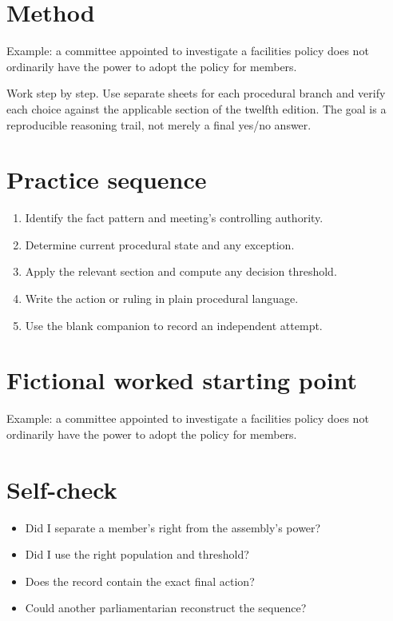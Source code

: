 \documentclass[11pt]{article}
\begin{document}
\SuiteOpen
\section{Method}
Example: a committee appointed to investigate a facilities policy does not ordinarily have the power to adopt the policy for members.

Work step by step. Use separate sheets for each procedural branch and verify each choice against the applicable section of the twelfth edition. The goal is a reproducible reasoning trail, not merely a final yes/no answer.

\section{Practice sequence}
\begin{enumerate}[leftmargin=*,itemsep=4pt]
\item Identify the fact pattern and meeting’s controlling authority.
\item Determine current procedural state and any exception.
\item Apply the relevant section and compute any decision threshold.
\item Write the action or ruling in plain procedural language.
\item Use the blank companion to record an independent attempt.
\end{enumerate}

\section{Fictional worked starting point}
Example: a committee appointed to investigate a facilities policy does not ordinarily have the power to adopt the policy for members.

\section{Self-check}
\begin{itemize}[leftmargin=*,itemsep=4pt]
\item Did I separate a member’s right from the assembly’s power?
\item Did I use the right population and threshold?
\item Does the record contain the exact final action?
\item Could another parliamentarian reconstruct the sequence?
\end{itemize}
\end{document}
